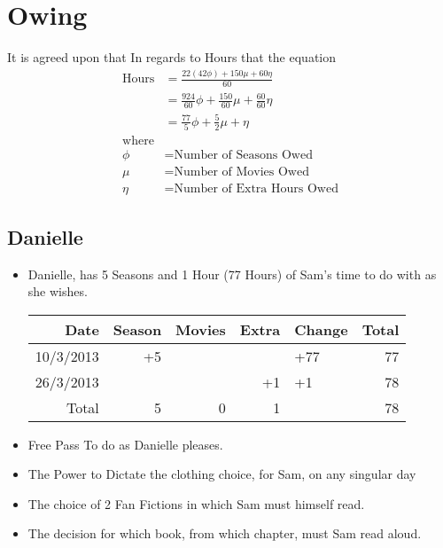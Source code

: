 

 

 \section{Owing}
 It is agreed upon that In regards to Hours that the equation
 \large
 \begin{align}
 \text{Hours} &= \frac{22(42\phi)+150\mu + 60\eta}{60}\\
 &= \frac{924}{60}\phi + \frac{150}{60}\mu + \frac{60}{60}\eta\\
 &= \frac{77}{5}\phi + \frac{5}{2}\mu + \eta\\\nonumber
  \text{where}\\ \nonumber
 \phi &=  \text{Number of Seasons Owed}\\\nonumber
 \mu &=  \text{Number of Movies Owed}\\\nonumber
 \eta &=  \text{Number of Extra Hours Owed}
 \end{align}
 
 

  
 \normalsize
 \subsection{Danielle}

 \begin{itemize}
   \item Danielle, has 5 Seasons and 1 Hour (77 Hours) of Sam's time to do with as she wishes.\\
    \begin{tabular}{r|rrr|l|r}
 		Date&Season&Movies&Extra&Change&Total\\
 		\hline
 		10/3/2013&+5&	&	&+77	&77\\
 		26/3/2013&	&	&+1	&+1		&78\\
 		\hline
 		\hline
 		Total&5&0&1&&78
 	\end{tabular}
   \item Free Pass To do as Danielle pleases.
   \item The Power to Dictate the clothing choice, for Sam, on any singular day
   \item The choice of 2 Fan Fictions in which Sam must himself read.
   \item The decision for which book, from which chapter, must Sam read aloud.
 \end{itemize} 
\newpage

 

